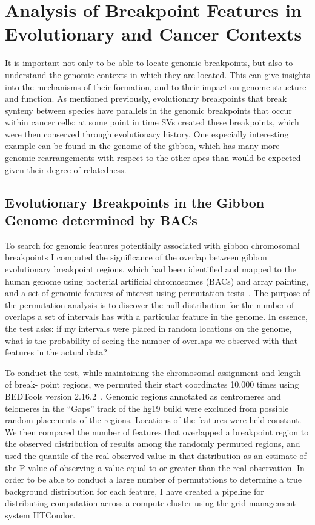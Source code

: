\documentclass [11pt] {report}
\begin{document}
\chapter{Analysis of Breakpoint Features in Evolutionary and Cancer Contexts}

It is important not only to be able to locate genomic breakpoints, but also to understand the genomic contexts in which they are located. This can give insights into the mechanisms of their formation, and to their impact on genome structure and function. As mentioned previously, evolutionary breakpoints that break synteny between species have parallels in the genomic breakpoints that occur within cancer cells: at some point in time SVs created these breakpoints, which were then conserved through evolutionary history. One especially interesting example can be found in the genome of the gibbon, which has many more genomic rearrangements with respect to the other apes than would be expected given their degree of relatedness.

\section{Evolutionary Breakpoints in the Gibbon Genome determined by BACs}

To search for genomic features potentially associated with gibbon chromosomal breakpoints I computed the significance of the overlap between gibbon evolutionary breakpoint regions, which had been identified and mapped to the human genome using bacterial artificial chromosomes (BACs) and array painting, and a set of genomic features of interest using permutation tests~\cite{Capozzi:2012bb}. The purpose of the permutation analysis is to discover the null distribution for the number of overlaps a set of intervals has with a particular feature in the genome. In essence, the test asks: if my intervals were placed in random locations on the genome, what is the probability of seeing the number of overlaps we observed with that features in the actual data? 

To conduct the test, while maintaining the chromosomal assignment and length of break- point regions, we permuted their start coordinates 10,000 times using BEDTools version 2.16.2~\cite{Quinlan:2010km}. Genomic regions annotated as centromeres and telomeres in the ``Gaps'' track of the hg19 build were excluded from possible random placements of the regions. Locations of the features were held constant. We then compared the number of features that overlapped a breakpoint region to the observed distribution of results among the randomly permuted regions, and used the quantile of the real observed value in that distribution as an estimate of the P-value of observing a value equal to or greater than the real observation. In order to be able to conduct a large number of permutations to determine a true background distribution for each feature, I have created a pipeline for distributing computation across a compute cluster using the grid management system HTCondor.
\end{document}
